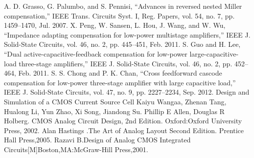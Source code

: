 \documentclass[a4paper,12pt]{article} %
\begin{document}
\begin{thebibliography}{}
 A. D. Grasso, G. Palumbo, and S. Pennisi, “Advances in reversed
nested Miller compensation,” IEEE Trans. Circuits Syst. I, Reg.
Papers, vol. 54, no. 7, pp. 1459–1470, Jul. 2007.
 X. Peng, W. Sansen, L. Hou, J. Wang, and W. Wu, “Impedance adapting compensation for low-power multistage amplifiers,” IEEE J. Solid-State Circuits, vol. 46, no. 2, pp. 445–451, Feb. 2011.
 S. Guo and H. Lee, “Dual active-capacitive-feedback compensation
for low-power large-capacitive-load three-stage amplifiers,” IEEE J.
Solid-State Circuits, vol. 46, no. 2, pp. 452–464, Feb. 2011.
 S. S. Chong and P. K. Chan, “Cross feedforward cascode compensation
for low-power three-stage amplifier with large capacitive load,” IEEE
J. Solid-State Circuits, vol. 47, no. 9, pp. 2227–2234, Sep. 2012.
 Design and Simulation of a CMOS Current Source Cell
Kaiyu Wangaa, Zhenan Tang, Hualong Li, Yun Zhao, Xi Song,
Jiandong Su.
 Phillip E Allen, Douglas R Holberg. CMOS Analog Circuit Design, 2nd Edition. Oxford:Oxford University Press, 2002.
Alan Hastings .The Art of Analog Layout Second Edition. Prentice Hall Press,2005.
Razavi B.Design of Analog CMOS Integrated Circuits[M]Boston,MA:McGraw-Hill Press,2001.

\end{thebibliography}
\end{document}
